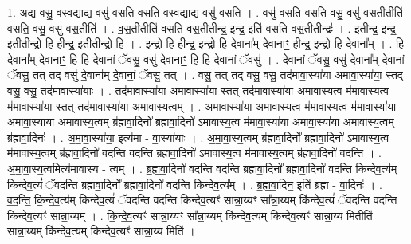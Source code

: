 \documentclass[17pt]{extarticle}
\begin{document}
1. अ॒द्य वसु॒ वस्व॒द्याद्य वसु॑ वसति वसति॒ वस्व॒द्याद्य वसु॑ वसति । . वसु॑ वसति वसति॒ वसु॒ वसु॑ वस॒तीतीति॑ वसति॒ वसु॒ वसु॑ वस॒तीति॑ । . व॒स॒तीतीति॑ वसति वस॒तीतीन्द्र॒ इन्द्र॒ इति॑ वसति वस॒तीतीन्द्रः॑ । . इतीन्द्र॒ इन्द्र॒ इतीतीन्द्रो॒ हि हीन्द्र॒ इतीतीन्द्रो॒ हि । . इन्द्रो॒ हि हीन्द्र॒ इन्द्रो॒ हि दे॒वाना᳚म् दे॒वानाꣳ॒॒ हीन्द्र॒ इन्द्रो॒ हि दे॒वाना᳚म् । . हि दे॒वाना᳚म् दे॒वानाꣳ॒॒ हि हि दे॒वानां॒ ॅवसु॒ वसु॑ दे॒वानाꣳ॒॒ हि हि दे॒वानां॒ ॅवसु॑ । . दे॒वानां॒ ॅवसु॒ वसु॑ दे॒वाना᳚म् दे॒वानां॒ ॅवसु॒ तत् तद् वसु॑ दे॒वाना᳚म् दे॒वानां॒ ॅवसु॒ तत् । . वसु॒ तत् तद् वसु॒ वसु॒ तद॑मावा॒स्या॑या अमावा॒स्या॑या॒ स्तद् वसु॒ वसु॒ तद॑मावा॒स्या॑याः । . तद॑मावा॒स्या॑या अमावा॒स्या॑या॒ स्तत् तद॑मावा॒स्या॑या अमावास्य॒त्व म॑मावास्य॒त्व म॑मावा॒स्या॑या॒ स्तत् तद॑मावा॒स्या॑या अमावास्य॒त्वम् । . अ॒मा॒वा॒स्या॑या अमावास्य॒त्व म॑मावास्य॒त्व म॑मावा॒स्या॑या अमावा॒स्या॑या अमावास्य॒त्वम् ब्र॑ह्मवा॒दिनो᳚ ब्रह्मवा॒दिनो॑ ऽमावास्य॒त्व म॑मावा॒स्या॑या अमावा॒स्या॑या अमावास्य॒त्वम् ब्र॑ह्मवा॒दिनः॑ । . अ॒मा॒वा॒स्या॑या॒ इत्य॑मा - वा॒स्या॑याः । . अ॒मा॒वा॒स्य॒त्वम् ब्र॑ह्मवा॒दिनो᳚ ब्रह्मवा॒दिनो॑ ऽमावास्य॒त्व म॑मावास्य॒त्वम् ब्र॑ह्मवा॒दिनो॑ वदन्ति वदन्ति ब्रह्मवा॒दिनो॑ ऽमावास्य॒त्व म॑मावास्य॒त्वम् ब्र॑ह्मवा॒दिनो॑ वदन्ति । . अ॒मा॒वा॒स्य॒त्वमित्य॑मावास्य - त्वम् । . ब्र॒ह्म॒वा॒दिनो॑ वदन्ति वदन्ति ब्रह्मवा॒दिनो᳚ ब्रह्मवा॒दिनो॑ वदन्ति किन्देव॒त्य॑म् किन्देव॒त्यं॑ ॅवदन्ति ब्रह्मवा॒दिनो᳚ ब्रह्मवा॒दिनो॑ वदन्ति किन्देव॒त्य᳚म् । . ब्र॒ह्म॒वा॒दिन॒ इति॑ ब्रह्म - वा॒दिनः॑ । . व॒द॒न्ति॒ कि॒न्दे॒व॒त्य॑म् किन्देव॒त्यं॑ ॅवदन्ति वदन्ति किन्देव॒त्यꣳ॑ सान्ना॒य्यꣳ सा᳚न्ना॒य्यम् कि॑न्देव॒त्यं॑ ॅवदन्ति वदन्ति किन्देव॒त्यꣳ॑ सान्ना॒य्यम् । . कि॒न्दे॒व॒त्यꣳ॑ सान्ना॒य्यꣳ सा᳚न्ना॒य्यम् कि॑न्देव॒त्य॑म् किन्देव॒त्यꣳ॑ सान्ना॒य्य मितीति॑ सान्ना॒य्यम् कि॑न्देव॒त्य॑म् किन्देव॒त्यꣳ॑ सान्ना॒य्य मिति॑ । \newline
\end{document}
